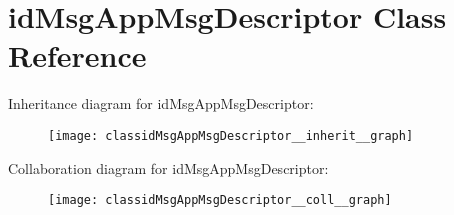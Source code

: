 \hypertarget{classidMsgAppMsgDescriptor}{}\section{id\+Msg\+App\+Msg\+Descriptor Class Reference}
\label{classidMsgAppMsgDescriptor}


Inheritance diagram for id\+Msg\+App\+Msg\+Descriptor\+:\nopagebreak
\begin{figure}[H]
\begin{center}
\leavevmode
\texttt{[image: classidMsgAppMsgDescriptor\_\_inherit\_\_graph]}
\end{center}
\end{figure}


Collaboration diagram for id\+Msg\+App\+Msg\+Descriptor\+:\nopagebreak
\begin{figure}[H]
\begin{center}
\leavevmode
\texttt{[image: classidMsgAppMsgDescriptor\_\_coll\_\_graph]}
\end{center}
\end{figure}
